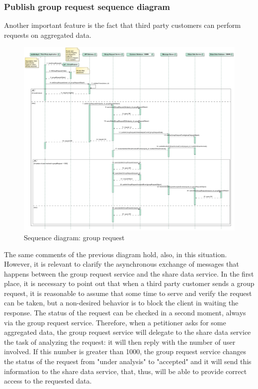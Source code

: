 \subsubsection{Publish group request sequence diagram}
Another important feature is the fact that third party customers can perform requests on aggregated data. \\


\begin{figure}[H]
\includegraphics[width=\linewidth]{Images/grouprequest.pdf}
\caption{ Sequence diagram: group request }
\label{fig:grouprequest}
\end{figure}

The same comments of the previous diagram hold, also, in this situation. 
However, it is relevant to clarify the asynchronous exchange of messages that happens between the group request service and the share data
service. 
In the first place, it is necessary to point out that when a third party customer sends a group request, it is reasonable to assume that 
some time to serve and verify the request can be taken, but a non-desired behavior is to block the client in waiting the response. The status
of the request can be checked in a second moment, always via the group request service. 
Therefore, when a petitioner asks for some aggregated data, the group request service will delegate to the share data service the task of 
analyzing the request: it will then reply with the number of user involved. If this number is greater than 1000, the group request service
changes the status of the request from "under analysis" to "accepted" and it will send this information to the share data service, that, thus,
will be able to provide correct access to the requested data. \\

